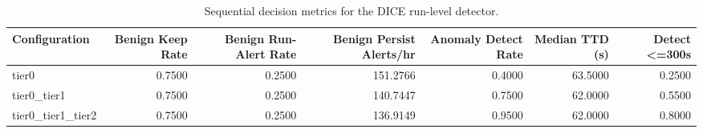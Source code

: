 \begin{table}[t]
\centering
\caption{Sequential decision metrics for the DICE run-level detector.}
\label{tab:dice_sequential_metrics}
\footnotesize
\begin{tabular}{lrrrrrr}
\toprule
Configuration & Benign Keep Rate & Benign Run-Alert Rate & Benign Persist Alerts/hr & Anomaly Detect Rate & Median TTD (s) & Detect <=300s \\
\midrule
tier0 & 0.7500 & 0.2500 & 151.2766 & 0.4000 & 63.5000 & 0.2500 \\
tier0_tier1 & 0.7500 & 0.2500 & 140.7447 & 0.7500 & 62.0000 & 0.5500 \\
tier0_tier1_tier2 & 0.7500 & 0.2500 & 136.9149 & 0.9500 & 62.0000 & 0.8000 \\
\bottomrule
\end{tabular}

\end{table}
